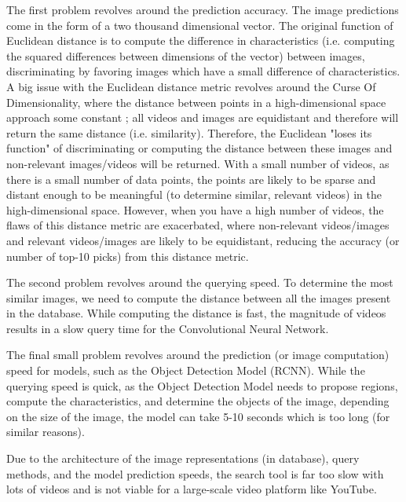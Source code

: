 \documentclass[10pt,twocolumn]{article}
\begin{document}
The first problem revolves around the prediction accuracy. The image predictions come in the form of a two thousand dimensional vector. The original function of Euclidean distance is to compute the difference in characteristics (i.e. computing the squared differences between dimensions of the vector) between images, discriminating by favoring images which have a small difference of characteristics. A big issue with the Euclidean distance metric revolves around the Curse Of Dimensionality, where the distance between points in a high-dimensional space approach some constant \cite{WikipediaCurseDimension}; all videos and images are equidistant and therefore will return the same distance (i.e. similarity). Therefore, the Euclidean "loses its function" \cite{WikipediaCurseDimension} of discriminating or computing the distance between these images and non-relevant images/videos will be returned. With a small number of videos, as there is a small number of data points, the points are likely to be sparse and distant enough to be meaningful (to determine similar, relevant videos) in the high-dimensional space. However, when you have a high number of videos, the flaws of this distance metric are exacerbated, where non-relevant videos/images and relevant videos/images are likely to be equidistant, reducing the accuracy (or number of top-10 picks) from this distance metric.

The second problem revolves around the querying speed. To determine the most similar images, we need to compute the distance between all the images present in the database. While computing the distance is fast, the magnitude of videos results in a slow query time for the Convolutional Neural Network.

The final small problem revolves around the prediction (or image computation) speed for models, such as the Object Detection Model (RCNN). While the querying speed is quick, as the Object Detection Model needs to propose regions, compute the characteristics, and determine the objects of the image, depending on the size of the image, the model can take 5-10 seconds which is too long (for similar reasons).

Due to the architecture of the image representations (in database), query methods, and the model prediction speeds, the search tool is far too slow with lots of videos and is not viable for a large-scale video platform like YouTube.
\end{document}
